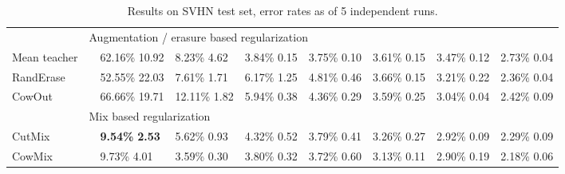 \documentclass{article}
\newcommand{\eb}[1]{\scriptsize\,\,#1}
\begin{document}
\begin{table*}[t]
\begin{center}
{\begin{tabular}{@{ }lllllllll@{ }}
&\multicolumn{8}{l}{\footnotesize{Augmentation / erasure based regularization}}\\
Mean teacher   &              & 62.16\%\eb{10.92}     & \hphantom{0}8.23\%\eb{4.62}      & \hphantom{0}3.84\%\eb{0.15}      & \hphantom{0}3.75\%\eb{0.10}      & \hphantom{0}3.61\%\eb{0.15}      & \hphantom{0}3.47\%\eb{0.12}      & \hphantom{0}2.73\%\eb{0.04} \\ 
RandErase      &              & 52.55\%\eb{22.03}     & \hphantom{0}7.61\%\eb{1.71}      & \hphantom{0}6.17\%\eb{1.25}      & \hphantom{0}4.81\%\eb{0.46}      & \hphantom{0}3.66\%\eb{0.15}      & \hphantom{0}3.21\%\eb{0.22}      & \hphantom{0}2.36\%\eb{0.04} \\ 
CowOut         &              & 66.66\%\eb{19.71}     & 12.11\%\eb{1.82}      & \hphantom{0}5.94\%\eb{0.38}      & \hphantom{0}4.36\%\eb{0.29}      & \hphantom{0}3.59\%\eb{0.25}      & \hphantom{0}3.04\%\eb{0.04}      & \hphantom{0}2.42\%\eb{0.09} \\ 

&\multicolumn{8}{l}{\footnotesize{Mix based regularization}}\\
CutMix         &              & \hphantom{0}\bf9.54\%\eb{2.53}     & \hphantom{0}5.62\%\eb{0.93}      & \hphantom{0}4.32\%\eb{0.52}      & \hphantom{0}3.79\%\eb{0.41}      & \hphantom{0}3.26\%\eb{0.27}      & \hphantom{0}2.92\%\eb{0.09}      & \hphantom{0}2.29\%\eb{0.09} \\ 
CowMix         &              & \hphantom{0}9.73\%\eb{4.01}     & \hphantom{0}3.59\%\eb{0.30}      & \hphantom{0}3.80\%\eb{0.32}      & \hphantom{0}3.72\%\eb{0.60}      & \hphantom{0}3.13\%\eb{0.11}      & \hphantom{0}2.90\%\eb{0.19}      & \hphantom{0}2.18\%\eb{0.06} \\ 
\hline

\end{tabular}}\vspace*{-1mm}\caption{Results on SVHN test set, error rates as  of 5 independent runs.}
\label{tab:results:svhn}
\end{center}
\end{table*}
\end{document}
